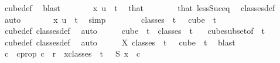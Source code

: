 \begin{isabellebody}
\ cube{\isacharunderscore}{\kern0pt}def\ \isamarkupfalse%
\ blast\isanewline
\ \ \ \ \isamarkupfalse%
\ \isamarkupfalse%
\ {\isachardoublequoteopen}x\ u\ {\isasymin}\ {\isacharbraceleft}{\kern0pt}{\isachardot}{\kern0pt}{\isachardot}{\kern0pt}{\isacharless}{\kern0pt}t{\isacharbraceright}{\kern0pt}{\isachardoublequoteclose}\ \isamarkupfalse%
\ that\isanewline
\ \ \ \ \ \ \isamarkupfalse%
\ that\ less{\isacharunderscore}{\kern0pt}Suc{\isacharunderscore}{\kern0pt}eq\ \isamarkupfalse%
\ classes{\isacharunderscore}{\kern0pt}def\ \isamarkupfalse%
\ auto\isanewline
\ \ \ \ \isamarkupfalse%
\ \isamarkupfalse%
\ {\isachardoublequoteopen}x\ u\ {\isacharless}{\kern0pt}\ t{\isachardoublequoteclose}\ \isamarkupfalse%
\ simp\isanewline
\ \ \isamarkupfalse%
\isanewline
\ \ \isamarkupfalse%
\ \isamarkupfalse%
\ {\isachardoublequoteopen}classes\ {}\ t\ {}\ {\isasymsubseteq}\ cube\ {}\ t{\isachardoublequoteclose}\ \isamarkupfalse%
\ cube{\isacharunderscore}{\kern0pt}def\ classes{\isacharunderscore}{\kern0pt}def\ \isamarkupfalse%
\ auto\isanewline
\ \ \isamarkupfalse%
\ \isamarkupfalse%
\ {\isachardoublequoteopen}cube\ {}\ t\ {\isasymsubseteq}\ classes\ {}\ t\ {}{\isachardoublequoteclose}\ \isamarkupfalse%
\ cube{\isacharunderscore}{\kern0pt}subset{\isacharbrackleft}{\kern0pt}of\ {}\ t{\isacharbrackright}{\kern0pt}\ \isamarkupfalse%
\ cube{\isacharunderscore}{\kern0pt}def\ classes{\isacharunderscore}{\kern0pt}def\ \isamarkupfalse%
\ auto\isanewline
\ \ \isamarkupfalse%
\ \isamarkupfalse%
\ X{\isacharcolon}{\kern0pt}\ {\isachardoublequoteopen}classes\ {}\ t\ {}\ {\isacharequal}{\kern0pt}\ cube\ {}\ t{\isachardoublequoteclose}\ \isamarkupfalse%
\ blast\isanewline
\isanewline
\ \ \isamarkupfalse%
\ c{}\ \ c{}{\isacharunderscore}{\kern0pt}prop{\isacharcolon}{\kern0pt}\ {\isachardoublequoteopen}c{}\ {\isacharless}{\kern0pt}\ r\ {\isasymand}\ {\isacharparenleft}{\kern0pt}{\isasymforall}x{\isasymin}classes\ {}\ t\ {}{\isachardot}{\kern0pt}\ {\isasymchi}\ {\isacharparenleft}{\kern0pt}S\ x{\isacharparenright}{\kern0pt}\ {\isacharequal}{\kern0pt}\ c{}{\isacharparenright}{\kern0pt}{\isachardoublequoteclose}\ \isamarkupfalse%

\end{isabellebody}
